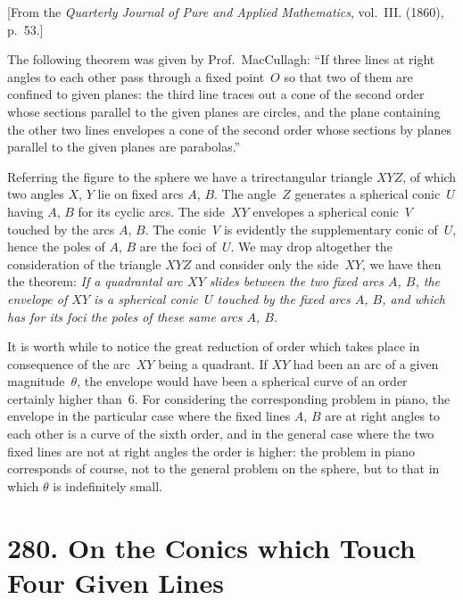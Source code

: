 \documentclass[11pt,a4paper]{book}
\begin{document}
[From the \textit{Quarterly Journal of Pure and Applied Mathematics}, vol.~III. (1860),
p.~53.]

The following theorem was given by Prof.~MacCullagh: ``If three lines at right
angles to each other pass through a fixed point~$O$ so that two of them are confined
to given planes: the third line traces out a cone of the second order whose sections
parallel to the given planes are circles, and the plane containing the other two lines
envelopes a cone of the second order whose sections by planes parallel to the given
planes are parabolas.''

Referring the figure to the sphere we have a trirectangular triangle $XYZ$, of which
two angles $X$, $Y$ lie on fixed arcs $A$, $B$. The angle~$Z$ generates a spherical conic~$U$
having $A$, $B$ for its cyclic arcs. The side~$XY$ envelopes a spherical conic~$V$ touched
by the arcs $A$, $B$. The conic~$V$ is evidently the supplementary conic of~$U$, hence
the poles of $A$, $B$ are the foci of~$U$. We may drop altogether the consideration of
the triangle $XYZ$ and consider only the side~$XY$, we have then the theorem:
\textit{If a quadrantal arc $XY$ slides between the two fixed arcs $A$, $B$, the envelope of
$XY$ is a spherical conic~$U$ touched by the fixed arcs $A$, $B$, and which has for its
foci the poles of these same arcs $A$, $B$.}

It is worth while to notice the great reduction of order which takes place in
consequence of the arc~$XY$ being a quadrant. If $XY$ had been an arc of a given
magnitude~$\theta$, the envelope would have been a spherical curve of an order certainly
higher than~6. For considering the corresponding problem in piano, the envelope in
the particular case where the fixed lines $A$, $B$ are at right angles to each other
is a curve of the sixth order, and in the general case where the two fixed lines are
not at right angles the order is higher: the problem in piano corresponds of course,
not to the general problem on the sphere, but to that in which $\theta$ is indefinitely small.
\clearpage


\thispagestyle{empty}

\setcounter{page}{429}

\section*{280. On the Conics which Touch Four Given Lines}
\label{sec:280}
\end{document}
